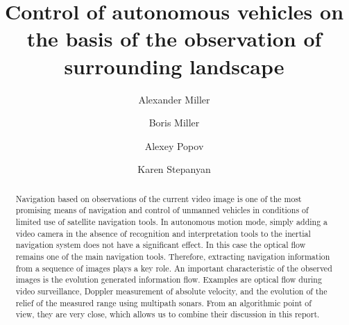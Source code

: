 \begin{englishtitle} %
\title{Control of autonomous vehicles on the basis of the observation of surrounding landscape}
\author{Alexander Miller 
  \and
  Boris Miller 
  \and
Alexey Popov 
  \and
  Karen Stepanyan 
}

\maketitle

\begin{abstract}
Navigation based on observations of the current video image is one of the most promising means of navigation and control of unmanned vehicles in conditions of limited use of satellite navigation tools. 
In autonomous motion mode, simply adding a video camera in the absence of recognition and interpretation tools to the inertial navigation system does not have a significant effect. In this case the optical flow remains one of the main navigation tools.%
Therefore, extracting navigation information from a sequence of images plays a key role. An important characteristic of the observed images is the evolution
generated information flow. Examples are optical flow during video surveillance, Doppler measurement of absolute velocity, and the evolution of the relief of the measured range using multipath sonars. From an algorithmic point
of view, they are very close, which allows us to combine their discussion in this report.

\end{abstract}

\end{englishtitle}

\iffalse
\documentclass[12pt]{llncs}  


\usepackage{iftex}

\ifPDFTeX
\usepackage[T2A]{fontenc}
\usepackage[utf8]{inputenc} %
\usepackage[english,russian]{babel}
\fi

\usepackage{todonotes} 

\usepackage[russian]{nla}


